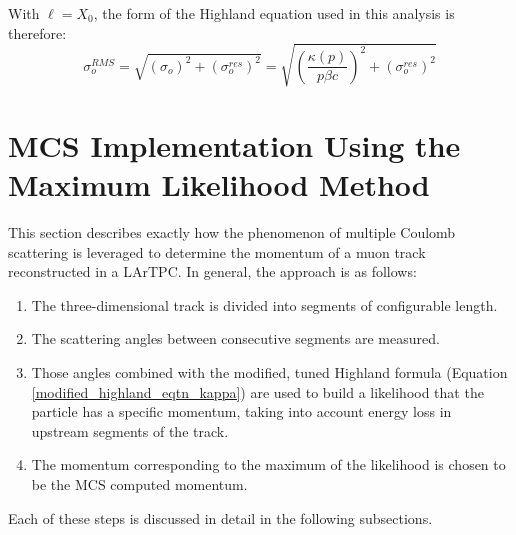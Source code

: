 \documentclass[a4paper,11pt]{article}
\begin{document}
With ${\ell} = X_0$, the form of the Highland equation used in this analysis is therefore:
\begin{equation}\label{modified_highland_eqtn_kappa}
\sigma_{o}^{RMS} = \sqrt{ (\sigma_o)^2 + (\sigma_o^{res})^2} = \sqrt{ (\frac{\kappa(p)}{p\beta c})^2 + (\sigma_o^{res})^2 }
\end{equation}












\section{MCS Implementation Using the Maximum Likelihood Method}\label{MCS_technique_section}

This section describes exactly how the phenomenon of multiple Coulomb scattering is leveraged to determine the momentum of a muon track reconstructed in a LArTPC. In general, the approach is as follows:
\begin{enumerate}
\item The three-dimensional track is divided into segments of configurable length.
\item The scattering angles between consecutive segments are measured.
\item Those angles combined with the modified, tuned Highland formula (Equation \ref{modified_highland_eqtn_kappa}) are used to build a likelihood that the particle has a specific momentum, taking into account energy loss in upstream segments of the track.
\item The momentum corresponding to the maximum of the likelihood is chosen to be the MCS computed momentum.
\end{enumerate}
Each of these steps is discussed in detail in the following subsections.\\

\end{document}
